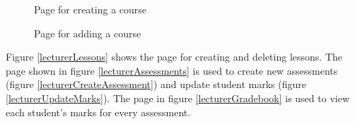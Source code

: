 \documentclass[a4paper,12pt]{article}
\numberwithin{equation}{section} %
\numberwithin{figure}{section}
\begin{document}
\begin{figure}[H]
\minipage[t]{\minipageWidth}
	\centering
	\vspace{-0.2cm}
	\caption{Page for creating a course}
	\label{createCourse}
\endminipage\hfill
\minipage[t]{\minipageWidth}
	\centering
	\vspace{-0.2cm}
	\caption{Page for adding a course}
	\label{addCourse}
\endminipage
\end{figure}

Figure \ref{lecturerLessons} shows the page for creating and deleting lessons. The page shown in figure \ref{lecturerAssessments} is used to create new assessments (figure \ref{lecturerCreateAssessment}) and update student marks (figure \ref{lecturerUpdateMarks}). The page in figure \ref{lecturerGradebook} is used to view each student's marks for every assessment.
\end{document}

